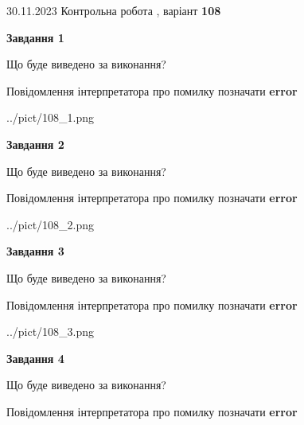 \documentclass[12pt, ukrainian]{article}
\begin{document}
{{30.11.2023 Контрольна робота , варіант  \No \textbf { 108 }\par}}
{




{\begin {center}\textbf{Завдання 1}\end {center}}\par
Що буде виведено за виконання? \par
Повідомлення інтерпретатора про помилку позначати \textbf{error}

\begin{center}
	{../pict/108_1.png}
\end{center}
\newpage

{\begin {center}\textbf{Завдання 2}\end {center}}\par
Що буде виведено за виконання? \par
Повідомлення інтерпретатора про помилку позначати \textbf{error}

\begin{center}
	{../pict/108_2.png}
\end{center}
\newpage

{\begin {center}\textbf{Завдання 3}\end {center}}\par
Що буде виведено за виконання? \par
Повідомлення інтерпретатора про помилку позначати \textbf{error}

\begin{center}
	{../pict/108_3.png}
\end{center}
\newpage

{\begin {center}\textbf{Завдання 4}\end {center}}\par
Що буде виведено за виконання? \par
Повідомлення інтерпретатора про помилку позначати \textbf{error}

}
\end{document}
